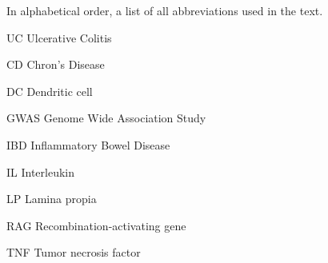 \documentclass[../main.tex]{subfiles}
\begin{document}
In alphabetical order, a list of all abbreviations used in the text. 

UC \quad \quad \quad Ulcerative Colitis

CD \quad \quad \quad Chron's Disease

DC \quad \quad \quad Dendritic cell

GWAS \quad \quad \quad Genome Wide Association Study

IBD \quad \quad \quad Inflammatory Bowel Disease

IL \quad \quad \quad Interleukin

LP \quad \quad \quad Lamina propia

RAG \quad \quad \quad Recombination-activating gene

TNF \quad \quad \quad Tumor necrosis factor
\end{document}
